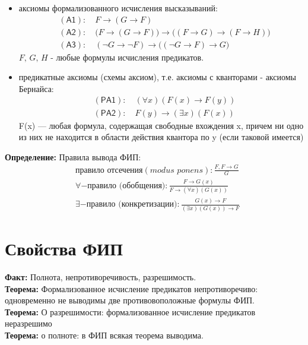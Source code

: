 \documentclass[../main.tex]{subfiles}
\begin{document}
\begin{itemize}
	\item аксиомы формализованного исчисления высказываний:
		\begin{align*}
			&\mathsf{(A1)}\colon\quad F\to (G\to F)\\ 
			&\mathsf{(A2)}\colon\quad \bigl(F\to (G\to F)\bigr)\to \bigl((F\to G)\to (F\to H)\bigr)\\ 
			&\mathsf{(A3)}\colon\quad (\lnot G\to\lnot F)\to \bigl((\lnot G\to F)\to G\bigr)
		\end{align*}
		$F,\,G,\,H$ - любые формулы исчисления предикатов.
	\item предикатные аксиомы (схемы аксиом), т.е. аксиомы с кванторами - аксиомы Бернайса:
		\begin{align*}
			&\mathsf{(PA1)}\colon\quad (\forall x)(F(x)\to F(y)) \\ 
			&\mathsf{(PA2)}\colon\quad F(y)\to (\exists x)(F(x))
		\end{align*}
		F(x) — любая формула, содержащая свободные вхождения x, причем ни одно из них не находится в области действия квантора по y (если таковой имеется)
\end{itemize}
\textbf{Определение:
} Правила вывода ФИП:
\begin{align*}
	&\text{правило отсечения}(\textit{modus ponens}):\frac{F, F \to G}{G} \\ 
	&\forall-\text{правило (обобщения)}: \frac{F\to G(x)}{F\to (\forall x)(G(x))} \\
	&\exists-\text{правило (конкретизации)}: \frac{G(x)\to F}{(\exists x)(G(x))\to F}
\end{align*}

\section{Свойства ФИП}
\textbf{Факт:
} Полнота, непротиворечивость, разрешимость.\\
\textbf{Теорема:
} Формализованное исчисление предикатов непротиворечиво: одновременно не выводимы две противовоположные формулы ФИП. \\
\textbf{Теорема:
} О разрешимости: формализованное исчисление предикатов неразрешимо \\
\textbf{Теорема:
} о полноте: в ФИП всякая теорема выводима.
\end{document}

